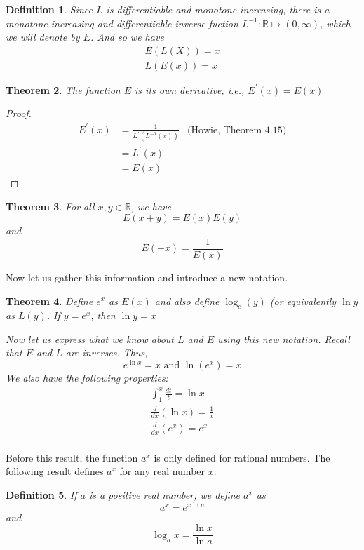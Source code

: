 \documentclass[12pt]{article}
\theoremstyle{mystyle}
\newtheorem{thm}{Theorem}
\newtheorem{defn}[thm]{Definition}
\newcommand{\R}{\mathbb{R}}
\begin{document}
\begin{defn}
  Since $L$ is differentiable and monotone increasing, there is a monotone
  increasing and differentiable inverse fuction $L^{-1}: \R \mapsto (0, \infty)$,
  which we will denote by $E$. And so we have
  \begin{align*}
    E(L(X)) = x \\
    L(E(x)) = x
  \end{align*} 
\end{defn}


\begin{thm}
  The function $E$ is its own derivative, i.e., $E^\prime(x) = E(x)$
\end{thm}
\begin{proof}
  \begin{align*}
    E^\prime(x) 
        &= \frac{1}{L^\prime(L^{-1}(x))}  & \text{(Howie, Theorem 4.15)} \\
        &= L^\prime(x) \\
        &= E(x)
  \end{align*}
\end{proof}


\begin{thm}
  For all $x,y \in \R$, we have
  $$ E(x+y) = E(x)E(y) $$
  and
  $$ E(-x) = \frac{1}{E(x)}$$
\end{thm}

Now let us gather this information and introduce a new notation.

\begin{thm}
  Define $e^x$ as $E(x)$ and also define $\log_e (y)$ (or equivalently $\ln y$
  as $L(y)$. If $y = e^x$, then $\ln y = x$
  
  Now let us express what we know about $L$ and $E$ using this new notation.
  Recall that $E$ and $L$ are inverses. Thus,
  $$ e^{\ln x} = x \text{ and } \ln(e^x) = x $$
  We also have the following properties:
  \begin{align*}
    \int_{1}^x \frac{dt}{t} = \ln x \\
    \frac{d}{dx}(\ln x) = \frac{1}{x} \\
    \frac{d}{dx}(e^x) = e^x \\
  \end{align*}
    
\end{thm}


Before this result, the function $a^x$ is only defined for rational numbers. The
following result defines $a^x$ for any real number $x$.
\begin{defn}
  If $a$ is a positive real number, we define $a^x$ as
  $$ a^x = e^{x \ln a} $$
  and
  $$ \log_a x = \frac{\ln x}{\ln a} $$
\end{defn}
\end{document}
